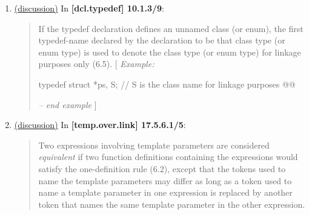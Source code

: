 \documentclass{wg21}
\begin{document}
\begin{enumerate}
  \item \label{wording.non-template} \hyperref[discussion.non-template]{(discussion)}
    In \textbf{[dcl.typedef] 10.1.3/9}:
    \begin{quote}
      If the typedef declaration defines an unnamed class (or enum), the first
      typedef-name declared by the declaration to be that class type (or enum type)
      is used to denote the class type (or enum type) for linkage purposes only (6.5).
      [ \textit{Example:}
\begin{codeblock}
typedef struct { } *ps, S; // S is the class name for linkage purposes
@@
\end{codeblock}
      \textit{-- end example} ]
    \end{quote}
  \item \label{wording.template} \hyperref[discussion.template]{(discussion)}
    In \textbf{[temp.over.link] 17.5.6.1/5}:
    \begin{quote}
      Two expressions involving template parameters are considered \textit{equivalent}
      if two function definitions containing the expressions would satisfy the
      one-definition rule (6.2), except that the tokens used to name the template
      parameters may differ as long as a token used to name a template parameter
      in one expression is replaced by another token that names the same template
      parameter in the other expression. 
    \end{quote}


\end{enumerate}
\end{document}
